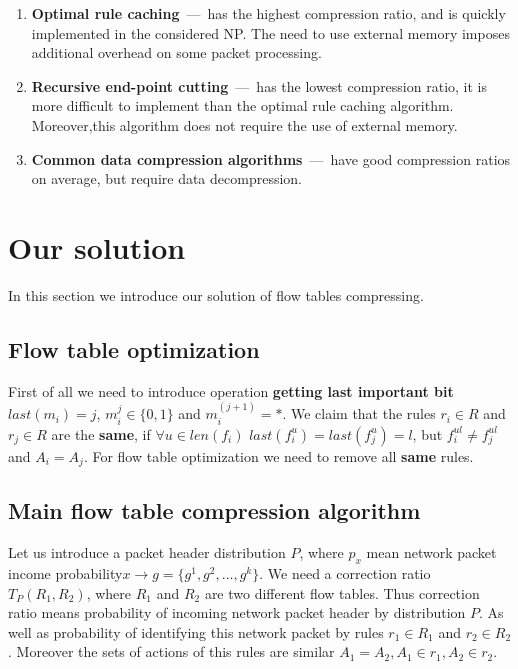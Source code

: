 \documentclass[conference]{IEEEtran}
\begin{document}
        \begin{enumerate}
            \item \textbf{Optimal  rule  caching}~---~has the highest compression ratio, and is quickly implemented in the considered NP. 
                The need to use external memory imposes additional overhead on some packet processing.
            \item \textbf{Recursive end-point cutting}~---~has the lowest compression ratio, it is more difficult to implement 
                than the optimal rule caching algorithm. Moreover,this algorithm does not require the use of external memory.
            \item \textbf{Common data compression algorithms}~---~have good compression ratios on average, but require data decompression.
        \end{enumerate}
  
    \section{Our solution}
        In this section we introduce our solution of flow tables compressing.
        \subsection{Flow table optimization}
            First of all we need to introduce operation {\bf getting last important bit} 
            \(last(m_i) = j\), \(m_i^j \in \{0, 1\}\) and \(m_i^{(j+1)} = *\). 
            We claim that the rules \(r_i \in R\) and \(r_j \in R\) are the {\bf same}, 
            if \(\forall u \in len(f_i)\) \(last(f_i^u) = last(f_j^u) = l\), but \(f_i^{ul} \neq f_j^{ul}\) and \(A_i = A_j\).
            For flow table optimization we need to remove all {\bf same} rules.

        \subsection{Main flow table compression algorithm}
            Let us introduce a packet header distribution \(P\), where \(p_x\) mean network packet income probability\(x \rightarrow g=\{g^1,g^2,\ldots,g^k\}\).
        We need a correction ratio \(T_P(R_1, R_2)\), where \(R_1\) and \(R_2\) are two different flow tables. 
        Thus correction ratio means probability of incoming network packet header by distribution \(P\).
        As well as probability of identifying this network packet by rules \(r_1 \in R_1\) and \(r_2 \in R_2\).
        Moreover the sets of actions of this rules are similar \(A_1 = A_2, A_1 \in r_1, A_2 \in r_2\).
        
\end{document}
